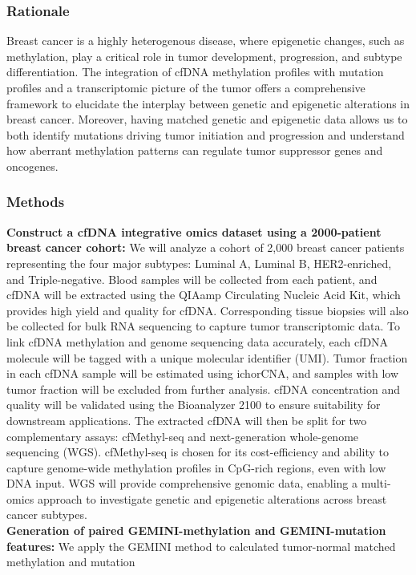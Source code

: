 \documentclass[11pt]{article}
\begin{document}
\subsubsection*{Rationale}
Breast cancer is a highly heterogenous disease, where epigenetic changes, such as methylation, 
play a critical role in tumor development, progression, and subtype differentiation.
The integration of cfDNA methylation profiles with mutation profiles and a transcriptomic picture of the tumor offers a comprehensive framework to elucidate the interplay between genetic and epigenetic alterations in breast cancer. 
Moreover, having matched genetic and epigenetic data allows us to both identify mutations driving tumor initiation and progression and understand how aberrant methylation patterns can regulate tumor suppressor genes and oncogenes.
\subsubsection*{Methods}
\textbf{Construct a cfDNA integrative omics dataset using a 2000-patient breast cancer cohort:}
We will analyze a cohort of 2,000 breast cancer patients representing the four major subtypes: Luminal A, Luminal B, HER2-enriched, and Triple-negative.
Blood samples will be collected from each patient, and cfDNA will be extracted using the QIAamp Circulating Nucleic Acid Kit, which provides high yield and quality for cfDNA.
Corresponding tissue biopsies will also be collected for bulk RNA sequencing to capture tumor transcriptomic data.
To link cfDNA methylation and genome sequencing data accurately, each cfDNA molecule will be tagged with a unique molecular identifier (UMI).
Tumor fraction in each cfDNA sample will be estimated using ichorCNA, and samples with low tumor fraction will be excluded from further analysis.
cfDNA concentration and quality will be validated using the Bioanalyzer 2100 to ensure suitability for downstream applications.
The extracted cfDNA will then be split for two complementary assays: cfMethyl-seq and next-generation whole-genome sequencing (WGS). cfMethyl-seq is chosen for its cost-efficiency and ability to capture genome-wide methylation profiles in CpG-rich regions, even with low DNA input. WGS will provide comprehensive genomic data, enabling a multi-omics approach to investigate genetic and epigenetic alterations across breast cancer subtypes.
\medskip \\ 
\textbf{Generation of paired GEMINI-methylation and GEMINI-mutation features:}
We apply the GEMINI method to calculated tumor-normal matched methylation and mutation
\end{document}
